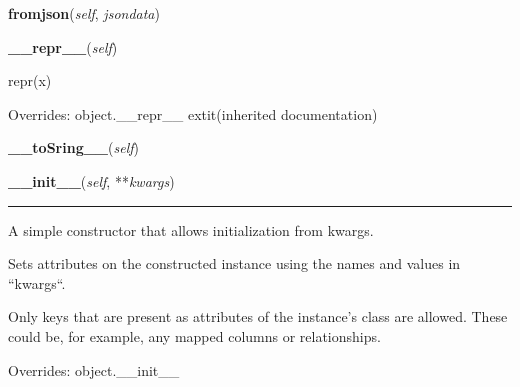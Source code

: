     \label{db_layer:Group:fromjson}

    \vspace{0.5ex}

\hspace{.8\funcindent}\begin{boxedminipage}{\funcwidth}

    \raggedright \textbf{fromjson}(\textit{self}, \textit{jsondata})

\setlength{\parskip}{2ex}
\setlength{\parskip}{1ex}
    \end{boxedminipage}

    \vspace{0.5ex}

\hspace{.8\funcindent}\begin{boxedminipage}{\funcwidth}

    \raggedright \textbf{\_\_repr\_\_}(\textit{self})

\setlength{\parskip}{2ex}
    repr(x)

\setlength{\parskip}{1ex}
      Overrides: object.\_\_repr\_\_ 	extit{(inherited documentation)}

    \end{boxedminipage}

    \label{db_layer:Group:__toSring__}

    \vspace{0.5ex}

\hspace{.8\funcindent}\begin{boxedminipage}{\funcwidth}

    \raggedright \textbf{\_\_toSring\_\_}(\textit{self})

\setlength{\parskip}{2ex}
\setlength{\parskip}{1ex}
    \end{boxedminipage}

    \vspace{0.5ex}

\hspace{.8\funcindent}\begin{boxedminipage}{\funcwidth}

    \raggedright \textbf{\_\_init\_\_}(\textit{self}, **\textit{kwargs})

    \vspace{-1.5ex}

    \rule{\textwidth}{0.5\fboxrule}
\setlength{\parskip}{2ex}
    A simple constructor that allows initialization from kwargs.

    Sets attributes on the constructed instance using the names and values 
    in ``kwargs``.

    Only keys that are present as attributes of the instance's class are 
    allowed. These could be, for example, any mapped columns or 
    relationships.

\setlength{\parskip}{1ex}
      Overrides: object.\_\_init\_\_

    \end{boxedminipage}


